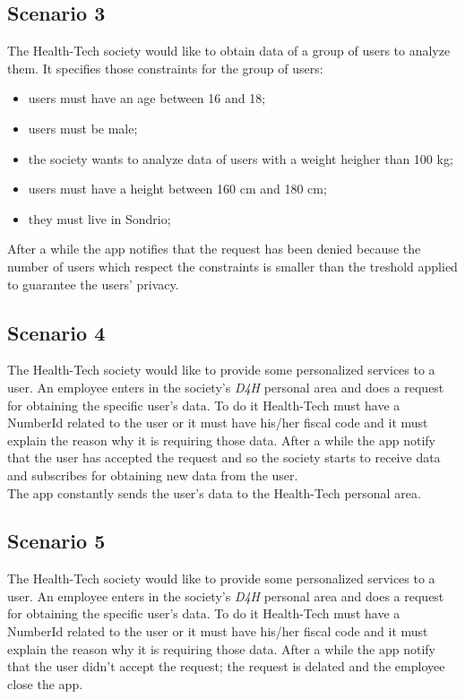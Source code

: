 \subsection{Scenario 3}
The Health-Tech society would like to obtain data of a group of users to analyze them. It specifies those constraints for the group of users:
\begin{itemize}
	\item {users must have an age between 16 and 18;}
	\item {users must be male;}
	\item {the society wants to analyze data of users with a weight heigher than 100 kg;}
	\item {users must have a height between 160 cm and 180 cm;}
	\item {they must live in Sondrio;}
\end{itemize}
After a while the app notifies that the request has been denied because the number of users which respect the constraints is smaller than the treshold applied to guarantee the users' privacy. 

\subsection{Scenario 4}
The Health-Tech society would like to provide some personalized services to a user. An employee enters in the society's  \textit{D4H} personal area and does a request for obtaining the specific user's data. 
To do it Health-Tech must have a NumberId related to the user or it must have his/her fiscal code and it must explain the reason why it is requiring those data. After a while the app notify that the user has accepted the request and so the society starts to receive data and subscribes for obtaining new data from the user.\\
The app constantly sends the user's data to the Health-Tech personal area.

\subsection{Scenario 5}
The Health-Tech society would like to provide some personalized services to a user. An employee enters in the society's  \textit{D4H} personal area and does a request for obtaining the specific user's data. 
To do it Health-Tech must have a NumberId related to the user or it must have his/her fiscal code and it must explain the reason why it is requiring those data. After a while the app notify that the user didn't accept the request; the request is delated and the employee close the app.

